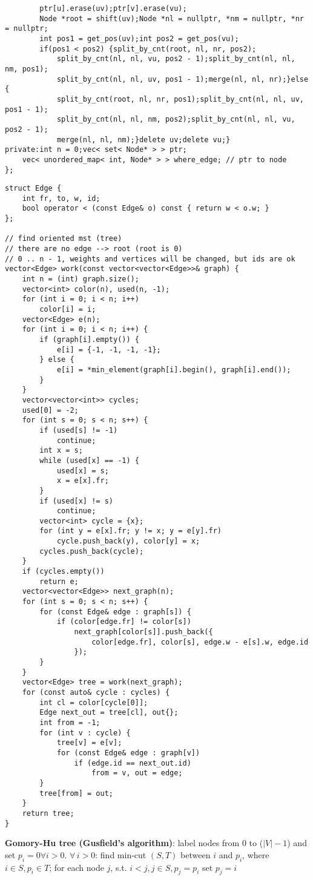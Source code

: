 \documentclass[12pt]{article}
\begin{document}
\begin{verbatim}
        ptr[u].erase(uv);ptr[v].erase(vu);
        Node *root = shift(uv);Node *nl = nullptr, *nm = nullptr, *nr = nullptr;
        int pos1 = get_pos(uv);int pos2 = get_pos(vu);
        if(pos1 < pos2) {split_by_cnt(root, nl, nr, pos2);
            split_by_cnt(nl, nl, vu, pos2 - 1);split_by_cnt(nl, nl, nm, pos1);
            split_by_cnt(nl, nl, uv, pos1 - 1);merge(nl, nl, nr);}else {
            split_by_cnt(root, nl, nr, pos1);split_by_cnt(nl, nl, uv, pos1 - 1);
            split_by_cnt(nl, nl, nm, pos2);split_by_cnt(nl, nl, vu, pos2 - 1);
            merge(nl, nl, nm);}delete uv;delete vu;}
private:int n = 0;vec< set< Node* > > ptr;
    vec< unordered_map< int, Node* > > where_edge; // ptr to node
};
\end{verbatim}

\begin{verbatim}
struct Edge {
    int fr, to, w, id;
    bool operator < (const Edge& o) const { return w < o.w; }
};

// find oriented mst (tree)
// there are no edge --> root (root is 0)
// 0 .. n - 1, weights and vertices will be changed, but ids are ok
vector<Edge> work(const vector<vector<Edge>>& graph) {
    int n = (int) graph.size();
    vector<int> color(n), used(n, -1);
    for (int i = 0; i < n; i++)
        color[i] = i;
    vector<Edge> e(n);
    for (int i = 0; i < n; i++) {
        if (graph[i].empty()) {
            e[i] = {-1, -1, -1, -1};
        } else {
            e[i] = *min_element(graph[i].begin(), graph[i].end());
        }
    }
    vector<vector<int>> cycles;
    used[0] = -2;
    for (int s = 0; s < n; s++) {
        if (used[s] != -1)
            continue;
        int x = s;
        while (used[x] == -1) {
            used[x] = s;
            x = e[x].fr;
        }
        if (used[x] != s)
            continue;
        vector<int> cycle = {x};
        for (int y = e[x].fr; y != x; y = e[y].fr)
            cycle.push_back(y), color[y] = x;
        cycles.push_back(cycle);
    }
    if (cycles.empty())
        return e;
    vector<vector<Edge>> next_graph(n);
    for (int s = 0; s < n; s++) {
        for (const Edge& edge : graph[s]) {
            if (color[edge.fr] != color[s])
                next_graph[color[s]].push_back({
                    color[edge.fr], color[s], edge.w - e[s].w, edge.id
                });
        }
    }
    vector<Edge> tree = work(next_graph);
    for (const auto& cycle : cycles) {
        int cl = color[cycle[0]];
        Edge next_out = tree[cl], out{};
        int from = -1;
        for (int v : cycle) {
            tree[v] = e[v];
            for (const Edge& edge : graph[v])
                if (edge.id == next_out.id)
                    from = v, out = edge;
        }
        tree[from] = out;
    }
    return tree;
}
\end{verbatim}

{\bf Gomory-Hu tree (Gusfield’s algorithm)}: label nodes from $0$ to ($|V| - 1$) and 
set $p_i=0 \forall i > 0$. $\forall\,i > 0$: find min-cut $(S, T)$ 
between $i$ and $p_i$, where $i \in S, p_i \in T$; 
for each node $j$, s.t. $i < j, j \in S, p_j=p_i$ set $p_j = i$
\end{document}
